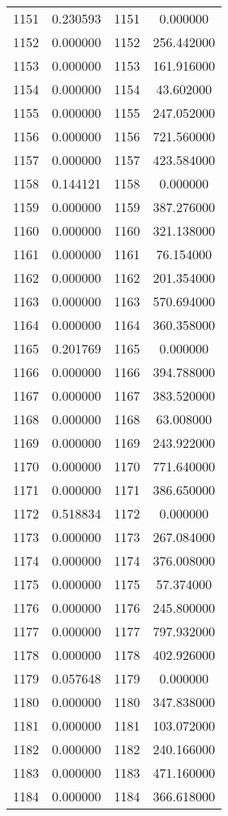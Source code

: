 \documentclass[12pt]{article}
\begin{document}
\begin{longtable}{@{}cccc@{}}
1151 & 0.230593 & 1151 & 0.000000 \\
1152 & 0.000000 & 1152 & 256.442000 \\
1153 & 0.000000 & 1153 & 161.916000 \\
1154 & 0.000000 & 1154 & 43.602000 \\
1155 & 0.000000 & 1155 & 247.052000 \\
1156 & 0.000000 & 1156 & 721.560000 \\
1157 & 0.000000 & 1157 & 423.584000 \\
1158 & 0.144121 & 1158 & 0.000000 \\
1159 & 0.000000 & 1159 & 387.276000 \\
1160 & 0.000000 & 1160 & 321.138000 \\
1161 & 0.000000 & 1161 & 76.154000 \\
1162 & 0.000000 & 1162 & 201.354000 \\
1163 & 0.000000 & 1163 & 570.694000 \\
1164 & 0.000000 & 1164 & 360.358000 \\
1165 & 0.201769 & 1165 & 0.000000 \\
1166 & 0.000000 & 1166 & 394.788000 \\
1167 & 0.000000 & 1167 & 383.520000 \\
1168 & 0.000000 & 1168 & 63.008000 \\
1169 & 0.000000 & 1169 & 243.922000 \\
1170 & 0.000000 & 1170 & 771.640000 \\
1171 & 0.000000 & 1171 & 386.650000 \\
1172 & 0.518834 & 1172 & 0.000000 \\
1173 & 0.000000 & 1173 & 267.084000 \\
1174 & 0.000000 & 1174 & 376.008000 \\
1175 & 0.000000 & 1175 & 57.374000 \\
1176 & 0.000000 & 1176 & 245.800000 \\
1177 & 0.000000 & 1177 & 797.932000 \\
1178 & 0.000000 & 1178 & 402.926000 \\
1179 & 0.057648 & 1179 & 0.000000 \\
1180 & 0.000000 & 1180 & 347.838000 \\
1181 & 0.000000 & 1181 & 103.072000 \\
1182 & 0.000000 & 1182 & 240.166000 \\
1183 & 0.000000 & 1183 & 471.160000 \\
1184 & 0.000000 & 1184 & 366.618000 \\

\end{longtable}
\end{document}
